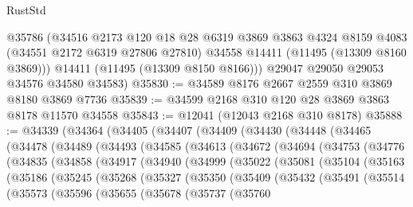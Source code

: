 \begin{lexlean}{RustStd}
\begin{coremodule}
        @35786
        (@34516
          @2173
          @120
          @18
          @28
          @6319
          @3869
          @3863
          @4324
          @8159
          @4083
          (@34551 @2172 @6319 @27806 @27810)
          @34558
          @14411
          (@11495 (@13309 @8160 @3869)))
        @14411
        (@11495 (@13309 @8150 @8166)))
      @29047
      @29050
      @29053
      @34576
      @34580
      @34583)
@35830 := @34589 @8176 @2667 @2559 @310 @3869 @8180 @3869 @7736
@35839 := @34599 @2168 @310 @120 @28 @3869 @3863 @8178 @11570 @34558
@35843 := @12041 (@12043 @2168 @310 @8178)
@35888 := @34339
    (@34364
      (@34405
        (@34407
          (@34409
            (@34430
              (@34448
                (@34465
                  (@34478
                    (@34489
                      (@34493
                        (@34585
                          (@34613
                            (@34672
                              (@34694
                                (@34753
                                  (@34776
                                    (@34835
                                      (@34858
                                        (@34917
                                          (@34940
                                            (@34999
                                              (@35022
                                                (@35081
                                                  (@35104
                                                    (@35163
                                                      (@35186
                                                        (@35245
                                                          (@35268
                                                            (@35327
                                                              (@35350
                                                                (@35409
                                                                  (@35432
                                                                    (@35491
                                                                      (@35514
                                                                        (@35573
                                                                          (@35596
                                                                            (@35655
                                                                              (@35678
                                                                                (@35737
                                                                                  (@35760

\end{coremodule}
\end{lexlean}
